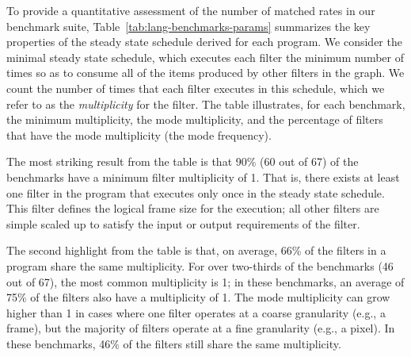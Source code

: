   To provide a quantitative assessment of the number of matched rates
  in our benchmark suite, Table~\ref{tab:lang-benchmarks-params}
  summarizes the key properties of the steady state schedule derived
  for each program.  We consider the minimal steady state schedule,
  which executes each filter the minimum number of times so as to
  consume all of the items produced by other filters in the graph.  We
  count the number of times that each filter executes in this
  schedule, which we refer to as the {\it multiplicity} for the
  filter.  The table illustrates, for each benchmark, the minimum
  multiplicity, the mode multiplicity, and the percentage of filters
  that have the mode multiplicity (the mode frequency).


  The most striking result from the table is that 90\% (60 out of 67)
  of the benchmarks have a minimum filter multiplicity of 1.  That is,
  there exists at least one filter in the program that executes only
  once in the steady state schedule.  This filter defines the logical
  frame size for the execution; all other filters are simple scaled up
  to satisfy the input or output requirements of the filter.  


  The second highlight from the table is that, on average, 66\% of the
  filters in a program share the same multiplicity.  For over
  two-thirds of the benchmarks (46 out of 67), the most common
  multiplicity is 1; in these benchmarks, an average of 75\% of the
  filters also have a multiplicity of 1.  The mode multiplicity can
  grow higher than 1 in cases where one filter operates at a coarse
  granularity (e.g., a frame), but the majority of filters operate at
  a fine granularity (e.g., a pixel).  In these benchmarks, 46\% of
  the filters still share the same multiplicity.

